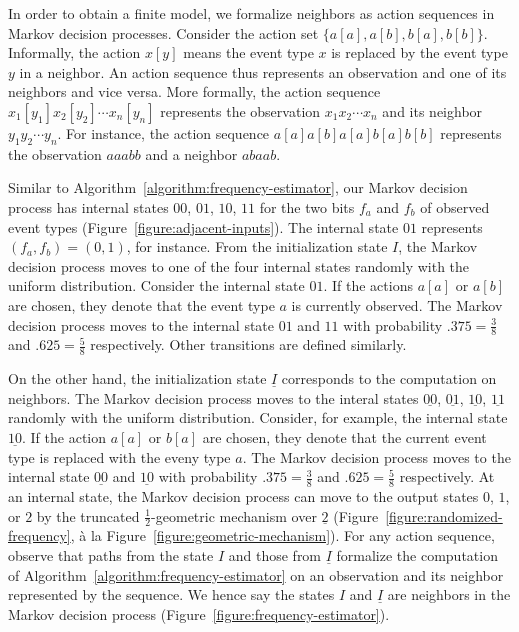 In order to obtain a finite model, we formalize neighbors as action
sequences in Markov decision processes. Consider the action set $\{
a[a], a[b], b[a], b[b] \}$. Informally, the action $x[y]$ means the
event type $x$ is replaced by the event type $y$ in a neighbor. An
action sequence thus represents an observation and one of its
neighbors and vice versa. More formally, the action sequence
$x_1[y_1]x_2[y_2]\cdots x_n[y_n]$ represents the observation
$x_1x_2\cdots x_n$ and its neighbor $y_1y_2\cdots y_n$. For instance,
the action sequence $a[a]a[b]a[a]b[a]b[b]$ represents the observation
$aaabb$ and a neighbor $abaab$.

Similar to Algorithm~\ref{algorithm:frequency-estimator}, our Markov
decision process has internal states $00$, $01$, $10$, $11$ for the
two bits $f_a$ and $f_b$ of observed event types
(Figure~\ref{figure:adjacent-inputs}). The internal state $01$
represents $(f_a, f_b) = (0, 1)$, for instance. From the
initialization state $I$, the Markov decision process moves to one of
the four internal states randomly with the uniform
distribution. Consider the internal state $01$. If the actions $a[a]$
or $a[b]$ are chosen, they denote that the event type $a$ is currently
observed. The Markov decision process moves to the internal state $01$
and $11$ with probability $.375 = \frac{3}{8}$ and $.625 =
\frac{5}{8}$ respectively. Other transitions are defined similarly.

On the other hand, the initialization state $\underline{I}$
corresponds to the computation on neighbors. The Markov decision
process moves to the interal states $\underline{00}$,
$\underline{01}$, $\underline{10}$, $\underline{11}$ randomly with
the uniform distribution. Consider, for example, the internal state
$\underline{10}$. If the action $a[a]$ or $b[a]$ are chosen, they
denote that the current event type is replaced with the eveny type
$a$. The Markov decision process moves to the internal state
$\underline{00}$ and $\underline{10}$ with probability $.375 =
\frac{3}{8}$ and $.625 = \frac{5}{8}$ respectively. At an internal
state, the Markov decision process can move to the output states $0$,
$1$, or $2$ by the truncated $\frac{1}{2}$-geometric mechanism over
$\underline{2}$ (Figure~\ref{figure:randomized-frequency}, \`{a} la
Figure~\ref{figure:geometric-mechanism}). For any action sequence,
observe that paths from the state $I$ and those from $\underline{I}$
formalize the computation of Algorithm~\ref{algorithm:frequency-estimator}
on an observation and its neighbor represented by the sequence. We
hence say the states $I$ and $\underline{I}$ are neighbors in the
Markov decision process (Figure~\ref{figure:frequency-estimator}).

